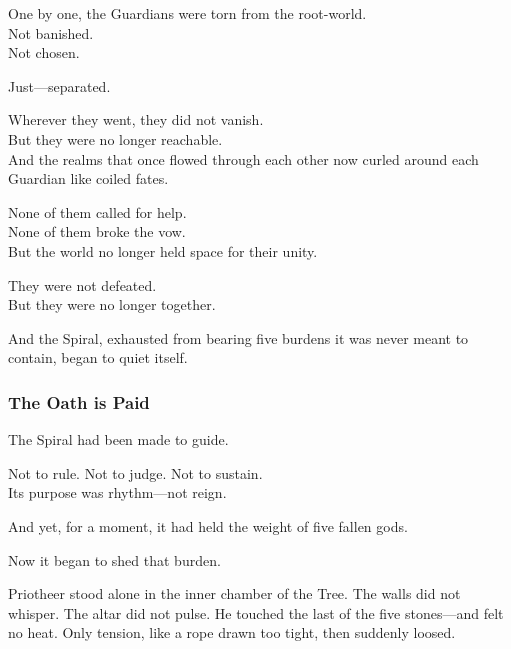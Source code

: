 \documentclass[12pt]{article}
\begin{document}
\vspace{0.5em}
One by one, the Guardians were torn from the root-world.\\
Not banished.\\
Not chosen.

\vspace{0.5em}
Just---separated.

\vspace{0.5em}
Wherever they went, they did not vanish.\\
But they were no longer reachable.\\
And the realms that once flowed through each other now curled around each Guardian like coiled fates.

\vspace{0.5em}
None of them called for help.\\
None of them broke the vow.\\
But the world no longer held space for their unity.

\vspace{0.5em}
They were not defeated.\\
But they were no longer together.

\vspace{0.5em}
And the Spiral, exhausted from bearing five burdens it was never meant to contain, began to quiet itself.

\dotfill

\subsubsection{The Oath is Paid}

The Spiral had been made to guide.

\vspace{0.5em}
Not to rule. Not to judge. Not to sustain.\\
Its purpose was rhythm---not reign.

\vspace{0.5em}
And yet, for a moment, it had held the weight of five fallen gods.

\vspace{0.5em}
Now it began to shed that burden.

\vspace{0.5em}
Priotheer stood alone in the inner chamber of the Tree. The walls did not whisper. The altar did not pulse. He touched the last of the five stones---and felt no heat. Only tension, like a rope drawn too tight, then suddenly loosed.
\end{document}
